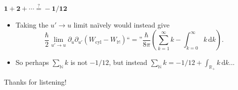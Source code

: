 \documentclass[pdf, fleqn, compress, handout]{beamer}
\begin{document}
\begin{frame}{$\boldsymbol{1 + 2 + \cdots \overset{?}{=} -1/12}$}
	\begin{itemize}
		\item	Taking the $u' \to u$ limit na\"ively would instead give
				\begin{equation*}
					\frac{\hbar}{2}
					\lim_{u' \to u}
					\partial_u \partial_{u'}
					\left(
						W_\mathrm{cyl} -
						W_\mathbb{M}
					\right)
						\text{``} \! = \! \text{''}
					\frac{\hbar}{8\pi}
						\left( 
							\sum_{k = 1}^\infty k
								-
							\int_{k = 0}^\infty k \, \mathrm{d}k
						 \right).
				\end{equation*}
		\pause
		\item	So perhaps $\sum_\mathbb{N} k$ is not $-1 / 12$, but instead
				$\sum_\mathbb{N} k = -1 / 12 + \int_{\mathbb{R}_+} k \, \mathrm{d}k$...
	\end{itemize}
\end{frame}

\begin{nonavigation}
\appendix

\begin{frame}
	Thanks for listening!
\end{frame}

\end{nonavigation}
\end{document}
